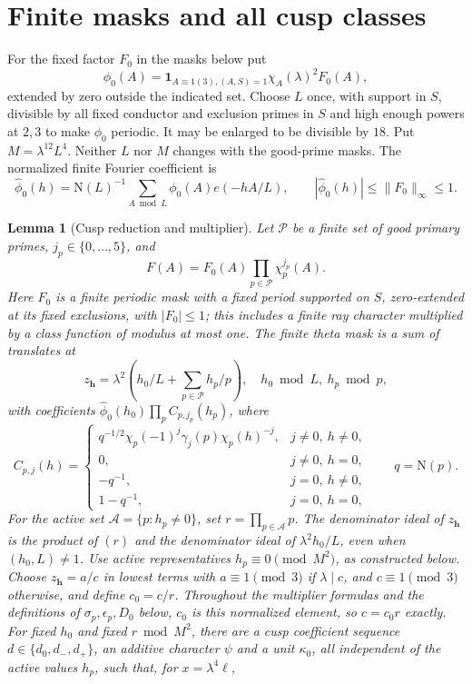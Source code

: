 \documentclass[11pt,a4paper]{article}
\numberwithin{equation}{section}
\newtheorem{lemma}[theorem]{Lemma}
\theoremstyle{definition}
\theoremstyle{remark}
\newcommand{\N}{\mathrm N}
\newcommand{\ind}{\mathbf 1}
\newcommand{\wt}{\widehat}
\begin{document}
\section{Finite masks and all cusp classes}\label{sec:cusps}
For the fixed factor $F_0$ in the masks below put
\[
 \phi_0(A)=\ind_{A\equiv1(3),(A,S)=1}\chi_A(\lambda)^2F_0(A),
\]
extended by zero outside the indicated set. Choose $L$ once, with support in $S$, divisible by all fixed conductor and exclusion primes in $S$ and high enough powers at $2,3$ to make $\phi_0$ periodic. It may be enlarged to be divisible by $18$. Put $M=\lambda^{12}L^4$. Neither $L$ nor $M$ changes with the good-prime masks. The normalized finite Fourier coefficient is
\[
 \wt\phi_0(h)=\N(L)^{-1}\sum_{A\bmod L}\phi_0(A)e(-hA/L),
 \qquad |\wt\phi_0(h)|\le\|F_0\|_\infty\le1.
\]

\begin{lemma}[Cusp reduction and multiplier]\label{lem:cusps}
Let $\mathcal P$ be a finite set of good primary primes, $j_p\in\{0,\ldots,5\}$, and
\[
 F(A)=F_0(A)\prod_{p\in\mathcal P}\chi_p^{j_p}(A).
\]
Here $F_0$ is a finite periodic mask with a fixed period supported on $S$, zero-extended at its fixed exclusions, with $|F_0|\le1$; this includes a finite ray character multiplied by a class function of modulus at most one. The finite theta mask is a sum of translates at
\[
 z_{\boldsymbol h}=\lambda^2\left(h_0/L+\sum_{p\in\mathcal P}h_p/p\right),\quad
 h_0\bmod L,\ h_p\bmod p,
\]
with coefficients $\wt\phi_0(h_0)\prod_pC_{p,j_p}(h_p)$, where
\begin{equation}\label{eq:finiteFourier}
 C_{p,j}(h)=\begin{cases}
 q^{-1/2}\chi_p(-1)^j\gamma_j(p)\chi_p(h)^{-j},&j\ne0,\ h\ne0,\\
 0,&j\ne0,\ h=0,\\
 -q^{-1},&j=0,\ h\ne0,\\
 1-q^{-1},&j=0,\ h=0,
 \end{cases}\qquad q=\N(p).
\end{equation}
For the active set $\mathcal A=\{p:h_p\ne0\}$, set $r=\prod_{p\in\mathcal A}p$. The denominator ideal of $z_{\boldsymbol h}$ is the product of $(r)$ and the denominator ideal of $\lambda^2h_0/L$, even when $(h_0,L)\ne1$. Use active representatives $h_p\equiv0\pmod{M^2}$, as constructed below. Choose $z_{\boldsymbol h}=a/c$ in lowest terms with $a\equiv1\pmod3$ if $\lambda\mid c$, and $c\equiv1\pmod3$ otherwise, and define $c_0=c/r$. Throughout the multiplier formulas and the definitions of $\sigma_p,\epsilon_p,D_0$ below, $c_0$ is this normalized element, so $c=c_0r$ exactly. For fixed $h_0$ and fixed $r\bmod M^2$, there are a cusp coefficient sequence $d\in\{d_0,d_-,d_+\}$, an additive character $\psi$ and a unit $\kappa_0$, all independent of the active values $h_p$, such that, for $x=\lambda^4\ell$,

\end{lemma}
\end{document}
